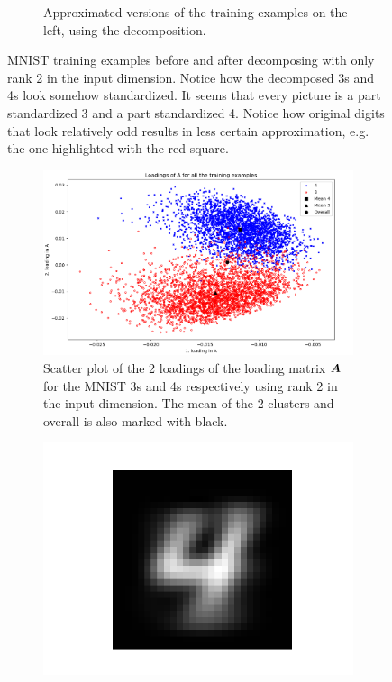 \begin{figure}
\begin{subfigure}{0.45\linewidth}
        \captionsetup{width=.9\linewidth}
        \caption{Approximated versions of the training examples on the left, using the decomposition.}
    \end{subfigure}
    \captionsetup{width=.95\linewidth}
    \caption{MNIST training examples before and after decomposing with only rank 2 in the input dimension. Notice how the decomposed 3s and 4s look somehow standardized. It seems that every picture is a part standardized 3 and a part standardized 4. Notice how original digits that look relatively odd results in less certain approximation, e.g. the one highlighted with the red square.}
    \label{fig:decompExample3_4}
\end{figure}

\begin{figure}
    \centering
    \begin{subfigure}{0.99\linewidth}
        \includegraphics[width=\linewidth]{Pics/06_results/LoadingsOfAScatterMNIST.png}
        \caption{Scatter plot of the 2 loadings of the loading matrix $\boldsymbol{A}$ for the MNIST 3s and 4s respectively using rank 2 in the input dimension. The mean of the 2 clusters and overall is also marked with black.}
        \label{fig:loadingAMatrix}
    \end{subfigure}
    \begin{subfigure}{0.3\linewidth}
    \centering
        \includegraphics[width=.5\linewidth]{Pics/06_results/general4.png}

\end{subfigure}
\end{figure}
